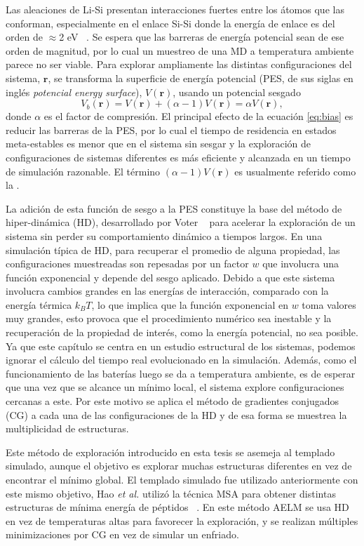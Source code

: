 Las aleaciones de Li-Si presentan interacciones fuertes entre los átomos que las
conforman, especialmente en el enlace Si-Si donde la energía de enlace es del
orden de $\approx$2 eV ~\cite{wypych2018handbook}. Se espera que las barreras de 
energía potencial sean de ese orden de magnitud, por lo cual un 
muestreo de una MD a temperatura ambiente parece no ser viable. Para explorar 
ampliamente las distintas configuraciones del sistema, $\mathbf{r}$, se 
transforma la superficie de energía potencial (PES, de sus siglas en inglés 
\textit{potencial energy surface}), $V(\mathbf{r})$, usando un potencial sesgado
\begin{equation}\label{eq:bias}
    V_b(\mathbf{r}) = V(\mathbf{r}) + (\alpha - 1) V(\mathbf{r}) = \alpha V(\mathbf{r}),
\end{equation}
donde $\alpha$ es el factor de compresión. El principal efecto de la ecuación 
\ref{eq:bias} es reducir las barreras de la PES, por lo cual el tiempo de
residencia en estados meta-estables es menor que en el sistema sin sesgar y la 
exploración de configuraciones de sistemas diferentes es más eficiente y 
alcanzada en un tiempo de simulación razonable. El término 
$(\alpha - 1) V(\mathbf{r})$ es usualmente referido como la 
.

La adición de esta función de sesgo a la PES constituye la base del método de 
hiper-dinámica (HD), desarrollado por Voter ~\cite{voter1997HD,voter1997method} 
para acelerar la exploración de un sistema sin perder su comportamiento dinámico a tiempos largos. En una 
simulación típica de HD, para recuperar el promedio de alguna propiedad, las 
configuraciones muestreadas son repesadas por un factor $w$ que involucra una función
exponencial y depende del sesgo aplicado. Debido a que este sistema involucra 
cambios grandes en las energías de interacción, comparado con la energía térmica
$k_BT$, lo que implica que la función exponencial en $w$ toma valores muy grandes,
esto provoca que el procedimiento numérico sea inestable y la recuperación de 
la propiedad de interés, como la energía potencial, no sea posible. Ya que este
capítulo se centra en un estudio estructural de los sistemas, podemos ignorar
el cálculo del tiempo real evolucionado en la simulación. Además, como el 
funcionamiento de las baterías luego se da a temperatura ambiente, es de esperar
que una vez que se alcance un mínimo local, el sistema explore configuraciones
cercanas a este. Por este motivo se aplica el método de gradientes conjugados (CG)
a cada una de las configuraciones de la HD y de esa forma se muestrea la 
multiplicidad de estructuras.

Este método de exploración introducido en esta tesis se asemeja al templado
simulado, aunque el objetivo es explorar muchas estructuras diferentes en vez de 
encontrar el mínimo global. El templado simulado fue utilizado anteriormente
con este mismo objetivo, Hao \textit{et al.} utilizó la técnica MSA para obtener
distintas estructuras de mínima energía de péptidos ~\cite{hao2015}. En este 
método AELM se usa HD en vez de temperaturas altas para favorecer la exploración,
y se realizan múltiples minimizaciones por CG en vez de simular un enfriado. 
